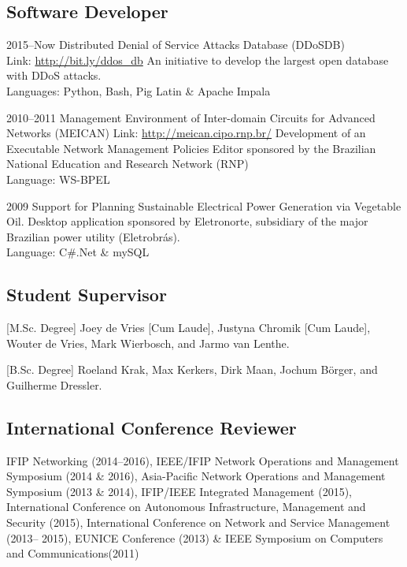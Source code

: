 \documentclass[print]{friggeri-cv} %
\begin{document}
\subsection{Software Developer}
\begin{entrylist}


\entry
{2015--Now}
{Distributed Denial of Service Attacks Database (DDoSDB)}
{\\Link: \href{http://bit.ly/ddos_db}{http://bit.ly/ddos\_db} }
{An initiative to develop the largest open database with DDoS attacks.\\
Languages: Python, Bash, Pig Latin \& Apache Impala
}

\entry
{2010--2011}
{{Management Environment of Inter-domain Circuits for Advanced Networks (MEICAN)}}
{Link: \href{http://meican.cipo.rnp.br/}{http://meican.cipo.rnp.br/}}
{Development of an Executable Network Management Policies Editor sponsored by the Brazilian National Education and Research Network (RNP)    \\
Language: WS-BPEL
}

\entry
{2009}
{Support for Planning Sustainable Electrical Power Generation via Vegetable Oil.}
{}
{Desktop application sponsored by Eletronorte, subsidiary of the major Brazilian power utility (Eletrobrás).\\
Language: C\#.Net \& mySQL
}
\end{entrylist}

\subsection{Student Supervisor}

\begin{entrylist}
\vspace{-0.3cm}
\entry
{[M.Sc. Degree]}
{Joey de Vries [Cum Laude], Justyna Chromik [Cum Laude], Wouter de Vries, Mark Wierbosch, and Jarmo van Lenthe.}
{}

\vspace{-0.3cm}
\entry
{[B.Sc. Degree]}
{Roeland Krak, Max Kerkers, Dirk Maan, Jochum Börger, and Guilherme Dressler.}
{}

\end{entrylist}

\subsection{International Conference Reviewer}
IFIP Networking (2014--2016), IEEE/IFIP Network Operations and Management Symposium (2014 \& 2016), Asia-Pacific Network Operations and Management Symposium (2013 \& 2014), IFIP/IEEE Integrated Management (2015), International Conference on Autonomous Infrastructure, Management and Security (2015), International Conference on Network and Service Management (2013-- 2015), EUNICE Conference (2013) \& IEEE Symposium on Computers and Communications(2011)\\
\end{document}
